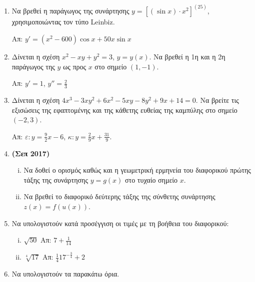 \begin{enumerate}
\item Να βρεθεί η παράγωγος της συνάρτησης $ y= \left[(\sin{x}) \cdot
  x^{2}\right]^{(25)}$, χρησιμοποιώντας τον τύπο Leinbiz.

  \hfill Απ: $ y' = (x^{2} - 600) \cos{x} + 50 x \sin{x} $

\item Δίνεται η σχέση $ x^{2} - xy + y^{2} = 3 $, $ y=y(x) $. Να βρεθεί η 1η
  και η 2η παράγωγος της $y$ ως προς $x$ στο σημείο $ (1,-1) $.

  \hfill Απ: $ y' = 1$, $ y'' = \frac{2}{3} $

\item Δίνεται η σχέση $ 4x^{3} - 3xy^{2} + 6x^{2} - 5xy - 8 y^{2} + 9x + 14
  = 0$. Να βρείτε τις εξισώσεις της εφαπτομένης και της κάθετης ευθείας
  της καμπύλης στο σημείο $ (-2,3) $.

  \hfill Απ: $\varepsilon\colon y = \frac{9}{2} x - 6 $, 
  $\kappa\colon y = \frac{2}{9} x + \frac{31}{9} $.

\item {\bfseries (Σεπ 2017)}
  \begin{enumerate}[i)]
    \item Να δοθεί ο ορισμός καθώς και η γεωμετρική
      ερμηνεία του διαφορικού πρώτης τάξης της συνάρτησης $ y = g(x) $ στο
      τυχαίο σημείο $x$. 
    \item Να βρεθεί το διαφορικό δεύτερης τάξης της σύνθετης συνάρτησης $ z(x) =
      f(u(x))	$.
  \end{enumerate}

\item Να υπολογιστούν κατά προσέγγιση οι τιμές με τη βοήθεια του διαφορικού:
  \begin{enumerate}[i)]
    \item $\sqrt{50}$ \hfill Απ: $7+\frac{1}{14}$
    \item $\sqrt[4]{17}$ \hfill Απ: $\frac{1}{4}17^{-\frac{3}{4}}+2$
  \end{enumerate}

\item Να υπολογιστούν τα παρακάτω όρια.
  \begin{enumerate}[(i)]
\end{enumerate}


\end{enumerate}
